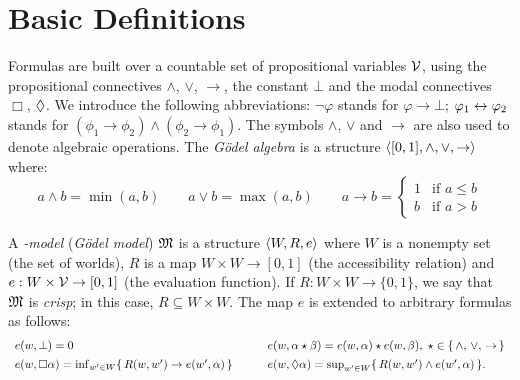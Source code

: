 \section{Basic Definitions}
\label{sec:basic}

Formulas are built over a countable set of propositional variables
$\mathcal{V}$, using the propositional connectives $\land$, $\lor$, $\to$, the
constant $\bot$ and the modal connectives $\Box$, $\lozenge$.  We introduce the following abbreviations:
$\neg \varphi$ stands  for $\varphi\to \bot$; 
$\varphi_1\leftrightarrow \varphi_2$  stands  for $(\phi_1\to \phi_2)\land(\phi_2\to \phi_1)$.
The symbols
$\land$, $\lor$ and $\to$ are also used to denote algebraic
operations.
The \emph{G\"odel algebra} is a structure
$\langle [0,1],\land,\lor,\to \rangle$ where:
\[
a\land b = \min(a,b)
\qquad
a \lor b = \max(a,b)
\qquad
a\to b =
\begin{cases}
  1 & \mbox{if $a\leq b$}\\
  b &  \mbox{if $a > b$}     
\end{cases}
\]

\noindent
A \emph{\GM-model} (\emph{G\"odel model}) $\mathfrak{M}$ is a structure
$\langle W,R,e \rangle$ where $W$ is a nonempty set (the set of worlds), $R$ is
a map $W\times W\to [0,1]$ (the accessibility relation) and $e : W
\times \mathcal{V}\to [0,1]$ (the evaluation function).  If $R : W\times W\to
\{0,1\}$, we say that $\mathfrak{M}$ is \emph{crisp}; in this case, $R \subseteq
W\times W$.  The map $e$ is extended to arbitrary formulas as follows:
\[
\begin{array}{ll}
  e(w,\bot) = 0 & e(w,\alpha \star \beta) = e(w,\alpha) \star e(w,\beta),\;\star\in \{\,\land,\,\lor,\,\to\,\}
  \\[1ex]
  e(w,\Box \alpha) = \inf_{w'\in W}  \{\,R(w,w') \to e(w',\alpha)  \,\}   \qquad
  &
  e(w,\lozenge \alpha) =  \sup_{w'\in W}  \{\,R(w,w') \land e(w',\alpha)  \,\}.               
\end{array}
\]  



